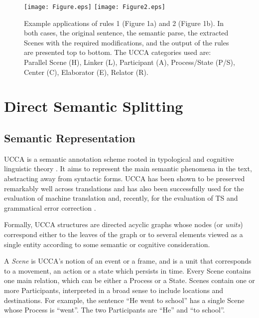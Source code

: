 \documentclass[11pt,a4paper]{article}
\begin{document}
\begin{figure*}[t!]
  \texttt{[image: Figure.eps]}
\hspace{-0.7cm}
\texttt{[image: Figure2.eps]}
\caption{Example applications of rules 1 (Figure 1a) and 2 (Figure 1b). In both cases, the original sentence, the semantic parse, the extracted Scenes with the required modifications, and the output of the rules are presented top to bottom.
The UCCA categories used are: Parallel Scene (H), Linker (L), Participant (A), Process/State (P/S), Center (C), Elaborator (E), Relator (R).} 
\label{ucca_rules}
\end{figure*}

\vspace{-0.1cm}
\section{Direct Semantic Splitting}\label{sec:semantics-based}

\subsection{Semantic Representation}\label{sec:ucca}

UCCA \citep[Universal Cognitive Conceptual Annotation;][]{AR13} is a semantic annotation scheme rooted in typological and cognitive linguistic theory \citep{D10A,D10B,D12,L08}.
It aims to represent the main semantic phenomena in the text, abstracting away from syntactic forms.
UCCA has been shown to be preserved remarkably well across translations \citep{S15} and has also been successfully used
for the evaluation of machine translation \citep{B16} and, recently, for the evaluation of TS \citep{S18} and grammatical error correction \citep{CA18}. 

Formally, UCCA structures are directed acyclic graphs whose nodes (or {\it units}) correspond either to the leaves of the graph or to several elements viewed as a single entity according to some semantic or cognitive consideration.

A {\it Scene} is UCCA's notion of an event or a frame, and is a unit that corresponds to a movement, an action or a state which persists in time. 
Every Scene contains one main relation, which can be either a Process or a State. Scenes contain one or more Participants, 
interpreted in a broad sense to include locations and destinations. 
For example, the sentence ``He went to school'' has a single Scene whose Process is ``went''. 
The two Participants  are ``He'' and ``to school''.
\end{document}
